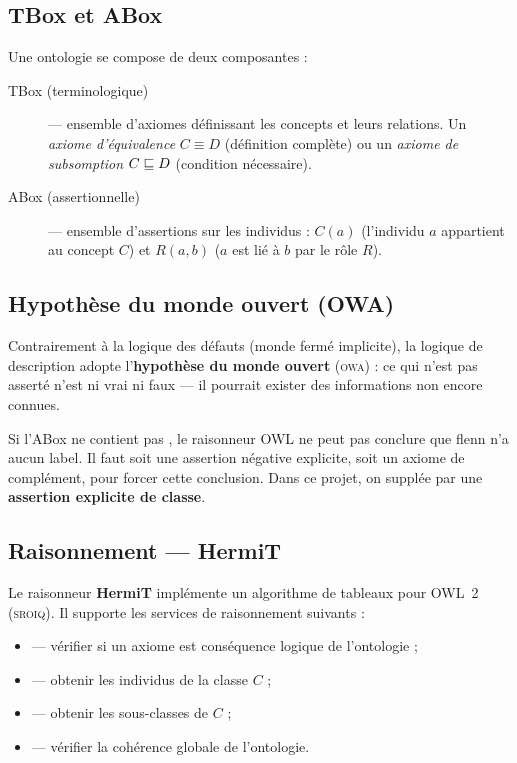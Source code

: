 \subsection{TBox et ABox}

Une ontologie se compose de deux composantes :

\begin{description}
  \item[TBox (terminologique)] — ensemble d'axiomes définissant les concepts et
    leurs relations.
    Un \emph{axiome d'équivalence} $C \equiv D$ (définition complète) ou
    un \emph{axiome de subsomption} $C \sqsubseteq D$ (condition nécessaire).

  \item[ABox (assertionnelle)] — ensemble d'assertions sur les individus :
    $C(a)$ (l'individu $a$ appartient au concept $C$) et
    $R(a,b)$ ($a$ est lié à $b$ par le rôle $R$).
\end{description}

\subsection{Hypothèse du monde ouvert (OWA)}

Contrairement à la logique des défauts (monde fermé implicite), la logique de
description adopte l'\textbf{hypothèse du monde ouvert} (\textsc{owa}) :
ce qui n'est pas asserté n'est ni vrai ni faux — il pourrait exister des
informations non encore connues.

\begin{tcolorbox}[notebox, title={OWA en pratique}]
Si l'ABox ne contient pas , le raisonneur OWL ne
peut pas conclure que flenn n'a aucun label. Il faut soit une assertion
négative explicite, soit un axiome de complément, pour forcer cette conclusion.
Dans ce projet, on supplée par une \textbf{assertion explicite de classe}.
\end{tcolorbox}

\subsection{Raisonnement — HermiT}

Le raisonneur \textbf{HermiT} implémente un algorithme de tableaux pour OWL~2
(\textsc{sroiq}).
Il supporte les services de raisonnement suivants :

\begin{itemize}
  \item {} — vérifier si un axiome est conséquence logique
        de l'ontologie ;
  \item {} — obtenir les individus de la classe $C$ ;
  \item {} — obtenir les sous-classes de $C$ ;
  \item {} — vérifier la cohérence globale de l'ontologie.
\end{itemize}


